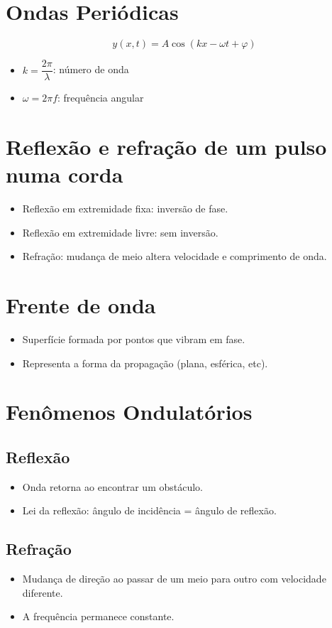 \documentclass[a4paper,12pt]{article}
\begin{document}
\begin{multicols}{2}
\section{Ondas Periódicas}
\[
    y(x, t) = A \cos(kx - \omega t + \varphi)
\]
\begin{itemize}
    \item $k = \dfrac{2\pi}{\lambda}$: número de onda
    \item $\omega = 2\pi f $: frequência angular
\end{itemize}

\section{Reflexão e refração de um pulso numa corda}
\begin{itemize}
    \item Reflexão em extremidade fixa: inversão de fase.
    \item Reflexão em extremidade livre: sem inversão.
    \item Refração: mudança de meio altera velocidade e comprimento de onda.
\end{itemize}

\section{Frente de onda}
\begin{itemize}
    \item Superfície formada por pontos que vibram em fase.
    \item Representa a forma da propagação (plana, esférica, etc).
\end{itemize}

\section{Fenômenos Ondulatórios}
\subsection{Reflexão}
\begin{itemize}
    \item Onda retorna ao encontrar um obstáculo.
    \item Lei da reflexão: ângulo de incidência = ângulo de reflexão.
\end{itemize}

\subsection{Refração}
\begin{itemize}
    \item Mudança de direção ao passar de um meio para outro com velocidade diferente.
    \item A frequência permanece constante.
\end{itemize}


\end{multicols}
\end{document}
